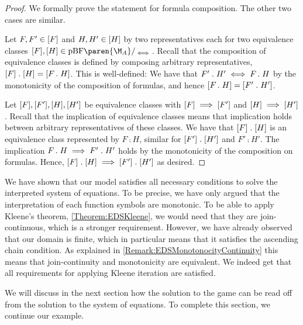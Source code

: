 \documentclass[../../diss.tex]{subfiles}
\begin{document}
\begin{proof}
    We formally prove the statement for formula composition.
    The other two cases are similar.

    Let $F,F' \in [F]$ and $H,H' \in [H]$ by two representatives each for two equivalence classes $\equivclass{F}, \equivclass{H} \in \pBF\paren{\nfatransmonoid{A}}/_{\lequiv}$.
    Recall that the composition of equivalence classes is defined by composing arbitrary representatives, $[F] \mathrel{.} [H] = [F \mathrel{.} H]$.
    This is well-defined: We have that $F' \mathrel{.} H' \iff F \mathrel{.} H$ by the monotonicity of the composition of formulas, and hence $[F \mathrel{.} H] = [F' \mathrel{.} H']$.

    Let $[F],[F'],[H],[H']$ be equivalence classes with $[F] \implies [F']$ and $[H] \implies [H']$.
    Recall that the implication of equivalence classes means that implication holds between arbitrary representatives of these classes.
    We have that $[F] \mathrel{.} [H]$ is an equivalence class represented by $F \comp H$, similar for $[F'] \mathrel{.} [H']$  and $F' \comp H'$.
    The implication $F \mathrel{.} H \implies F' \mathrel{.} H'$ holds by the monotonicity of the composition on formulas.
    Hence, $[F] \mathrel{.} [H] \implies [F'] \mathrel{.} [H']$ as desired.
\end{proof}

We have shown that our model satisfies all necessary conditions to solve the interpreted system of equations.
To be precise, we have only argued that the interpretation of each function symbols are monotonic.
To be able to apply Kleene's theorem, \cref{Theorem:EDSKleene}, we would need that they are join-continuous, which is a stronger requirement.
However, we have already observed that our domain is finite, which in particular means that it satisfies the ascending chain condition.
As explained in \cref{Remark:EDSMonotonocityContinuity} this means that join-continuity and monotonicity are equivalent.
We indeed get that all requirements for applying Kleene iteration are satisfied.

We will discuss in the next section how the solution to the game can be read off from the solution to the system of equations.
To complete this section, we continue our example.
\end{document}
